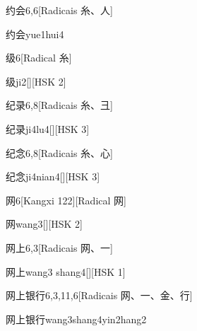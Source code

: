 \begin{entry}{约会}{6,6}[Radicais ⽷、⼈]
  \begin{phonetics}{约会}{yue1hui4}
  \end{phonetics}
\end{entry}

\begin{entry}{级}{6}[Radical ⽷]
  \begin{phonetics}{级}{ji2}[][HSK 2]
  \end{phonetics}
\end{entry}

\begin{entry}{纪录}{6,8}[Radicais ⽷、⼹]
  \begin{phonetics}{纪录}{ji4lu4}[][HSK 3]
  \end{phonetics}
\end{entry}

\begin{entry}{纪念}{6,8}[Radicais ⽷、⼼]
  \begin{phonetics}{纪念}{ji4nian4}[][HSK 3]
  \end{phonetics}
\end{entry}

\begin{entry}{网}{6}[Kangxi 122][Radical ⽹]
  \begin{phonetics}{网}{wang3}[][HSK 2]
  \end{phonetics}
\end{entry}

\begin{entry}{网上}{6,3}[Radicais ⽹、⼀]
  \begin{phonetics}{网上}{wang3 shang4}[][HSK 1]
  \end{phonetics}
\end{entry}

\begin{entry}{网上银行}{6,3,11,6}[Radicais ⽹、⼀、⾦、⾏]
  \begin{phonetics}{网上银行}{wang3shang4yin2hang2}
  \end{phonetics}
\end{entry}

